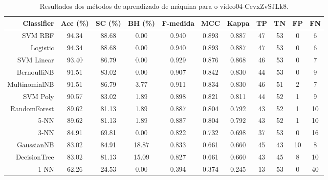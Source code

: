 \begin{table}[!htb]
\centering
\caption{Resultados dos métodos de aprendizado de máquina para o vídeo04-CevxZvSJLk8.}
\label{tab:04-CevxZvSJLk8}
\begin{tabular}{r|c|c|c|c|c|c|c|c|c|c}
\hline\hline
Classifier & Acc (\%) & SC (\%) & BH (\%) & F-medida & MCC & Kappa & TP & TN & FP & FN \\ \hline
SVM RBF & 94.34 & 88.68 & 0.00 & 0.940 & 0.893 & 0.887 & 47 & 53 & 0 & 6 \\ 
Logistic & 94.34 & 88.68 & 0.00 & 0.940 & 0.893 & 0.887 & 47 & 53 & 0 & 6 \\ 
SVM Linear & 93.40 & 86.79 & 0.00 & 0.929 & 0.876 & 0.868 & 46 & 53 & 0 & 7 \\ 
BernoulliNB & 91.51 & 83.02 & 0.00 & 0.907 & 0.842 & 0.830 & 44 & 53 & 0 & 9 \\ 
MultinomialNB & 91.51 & 86.79 & 3.77 & 0.911 & 0.834 & 0.830 & 46 & 51 & 2 & 7 \\ 
SVM Poly & 90.57 & 83.02 & 1.89 & 0.898 & 0.821 & 0.811 & 44 & 52 & 1 & 9 \\ 
RandomForest & 89.62 & 81.13 & 1.89 & 0.887 & 0.804 & 0.792 & 43 & 52 & 1 & 10 \\ 
5-NN & 89.62 & 81.13 & 1.89 & 0.887 & 0.804 & 0.792 & 43 & 52 & 1 & 10 \\ 
3-NN & 84.91 & 69.81 & 0.00 & 0.822 & 0.732 & 0.698 & 37 & 53 & 0 & 16 \\ 
GaussianNB & 83.02 & 84.91 & 18.87 & 0.833 & 0.661 & 0.660 & 45 & 43 & 10 & 8 \\ 
DecisionTree & 83.02 & 81.13 & 15.09 & 0.827 & 0.661 & 0.660 & 43 & 45 & 8 & 10 \\ 
1-NN & 62.26 & 24.53 & 0.00 & 0.394 & 0.374 & 0.245 & 13 & 53 & 0 & 40 \\ 
\hline\hline
\end{tabular}
\end{table}
